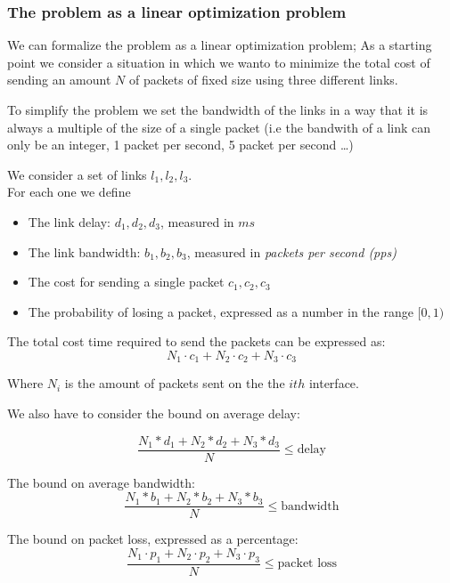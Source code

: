 \documentclass{article}
\begin{document}

\subsubsection{The problem as a linear optimization problem}

We can formalize the problem as a linear optimization problem;
As a starting point we consider a situation in which we wanto to minimize the total cost of sending an amount $N$ of packets of fixed size using three different links.

To simplify the problem we set the bandwidth of the links in a way that it is always a multiple of the size of a single packet (i.e the bandwith of a link can only be an integer, 1 packet per second, 5 packet per second \dots)


We consider a set of links $l_1, l_2, l_3$. \\

For each one we define
\begin{itemize}
	\item The link delay:  $d_1, d_2, d_3$, measured in $ms$
	\item The link bandwidth: $b_1, b_2, b_3$, measured in \textit{packets per second (pps)}
	\item The cost for sending a single packet $c_1, c_2, c_3$
	\item The probability of losing a packet, expressed as a number in the range $ [0, 1)$
\end{itemize}

The total cost time required to send the packets can be expressed as:
\[
	N_1 \cdot c_1 +
	N_2 \cdot c_2 +
	N_3 \cdot c_3 
\]

Where $N_i$ is the amount of packets sent on the the $ith$ interface.

We also have to consider the bound on average delay:

\[
	\frac
	{N_1 * d_1 + N_2 * d_2  + N_3 * d_3 }
	{N}
	 \le \text{delay}
\]

The bound on average bandwidth:
\[
\frac
{N_1 * b_1 + N_2 * b_2  + N_3 * b_3 }
{N}
\le \text{bandwidth}
\]

The bound on packet loss, expressed as a percentage:
\[
\frac
{N_1 \cdot p_1 + N_2 \cdot p_2 + N_3 \cdot p_3 }
{N}
\le \text{packet loss}
\]
\end{document}
